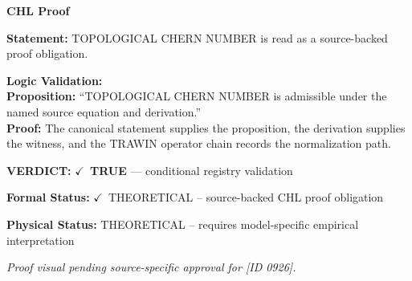 \vspace{0.45em}
\noindent\textbf{CHL Proof}\par
\textbf{Statement:} TOPOLOGICAL CHERN NUMBER is read as a source-backed proof obligation.

\textbf{Logic Validation:}\\
\textbf{Proposition:} ``TOPOLOGICAL CHERN NUMBER is admissible under the named source equation and derivation.''\\
\textbf{Proof:} The canonical statement supplies the proposition, the derivation supplies the witness, and the TRAWIN operator chain records the normalization path.

\textbf{VERDICT:} \ensuremath{\checkmark}\ \textbf{TRUE} --- conditional registry validation

\textbf{Formal Status:} \ensuremath{\checkmark}\ THEORETICAL -- source-backed CHL proof obligation

\textbf{Physical Status:} THEORETICAL -- requires model-specific empirical interpretation
\par\vspace{0.45em}
\par
\vfill
\begingroup\footnotesize\itshape
Proof visual pending source-specific approval for [ID 0926].
\par\endgroup
\vfill
\endgroup
\endgroup
